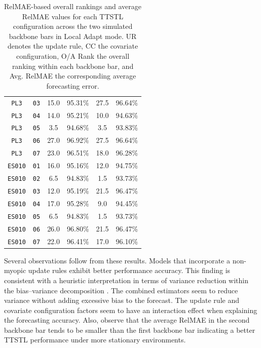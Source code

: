 \documentclass[10pt,a4paper,oneside]{article}
\begin{document}
\begin{table}[htb]
\begin{tabular}{@{}cccccc@{}}
        \verb|PL3|   & \verb|03| & 15.0         & 95.31\%         & 27.5         & 96.64\%         \\
        \verb|PL3|   & \verb|04| & 14.0         & 95.21\%         & 10.0         & 94.63\%         \\
        \verb|PL3|   & \verb|05| & 3.5          & 94.68\%         & 3.5          & 93.83\%         \\
        \verb|PL3|   & \verb|06| & 27.0         & 96.92\%         & 27.5         & 96.64\%         \\
        \verb|PL3|   & \verb|07| & 23.0         & 96.51\%         & 18.0         & 96.28\%         \\
        \verb|ES010| & \verb|01| & 16.0         & 95.16\%         & 12.0         & 94.75\%         \\
        \verb|ES010| & \verb|02| & 6.5          & 94.83\%         & 1.5          & 93.73\%         \\
        \verb|ES010| & \verb|03| & 12.0         & 95.19\%         & 21.5         & 96.47\%         \\
        \verb|ES010| & \verb|04| & 17.0         & 95.28\%         & 9.0          & 94.45\%         \\
        \verb|ES010| & \verb|05| & 6.5          & 94.83\%         & 1.5          & 93.73\%         \\
        \verb|ES010| & \verb|06| & 26.0         & 96.80\%         & 21.5         & 96.47\%         \\
        \verb|ES010| & \verb|07| & 22.0         & 96.41\%         & 17.0         & 96.10\%         \\
        \bottomrule
    \end{tabular}
    \caption{RelMAE-based overall rankings and average RelMAE values for each TTSTL configuration across the two simulated backbone bars in Local Adapt mode. UR denotes the update rule, CC the covariate configuration, O/A Rank the overall ranking within each backbone bar, and Avg. RelMAE the corresponding average forecasting error.}
    \label{tab:rankings_relmae_table}
\end{table}

Several observations follow from these results. Models that incorporate a non-myopic update rules exhibit better performance accuracy. This finding is consistent with a heuristic interpretation in terms of variance reduction within the bias–variance decomposition \cite{hastie2017elements}. The combined estimators seem to reduce variance without adding excessive bias to the forecast. The update rule and covariate configuration factors seem to have an interaction effect when explaining the forecasting accuracy. Also, observe that the average RelMAE in the second backbone bar tends to be smaller than the first backbone bar indicating a better TTSTL performance under more stationary environments.
\end{document}
